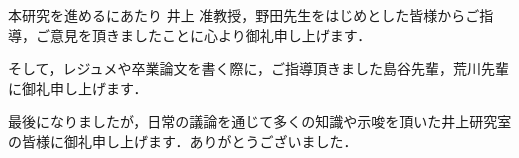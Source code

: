 \theacknowledgments

本研究を進めるにあたり 井上 准教授，野田先生をはじめとした皆様からご指導，ご意見を頂きましたことに心より御礼申し上げます．

そして，レジュメや卒業論文を書く際に，ご指導頂きました島谷先輩，荒川先輩に御礼申し上げます．

最後になりましたが，日常の議論を通じて多くの知識や示唆を頂いた井上研究室の皆様に御礼申し上げます．ありがとうございました．
